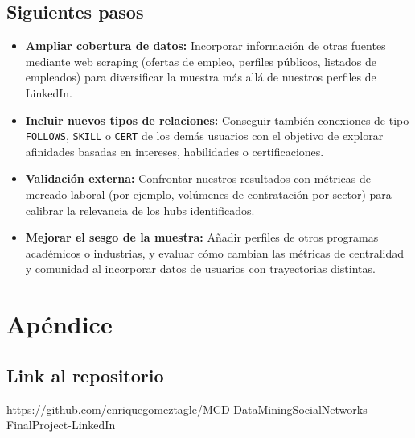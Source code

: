 \documentclass[10pt]{article}
\begin{document}
\subsection{Siguientes pasos}
\begin{itemize}
	\item \textbf{Ampliar cobertura de datos:} Incorporar información de otras fuentes mediante web scraping (ofertas de empleo, perfiles públicos, listados de empleados) para diversificar la muestra más allá de nuestros perfiles de LinkedIn.
	\item \textbf{Incluir nuevos tipos de relaciones:} Conseguir también conexiones de tipo \texttt{FOLLOWS}, \texttt{SKILL} o \texttt{CERT} de los demás usuarios con el objetivo de explorar afinidades basadas en intereses, habilidades o certificaciones.
	\item \textbf{Validación externa:} Confrontar nuestros resultados con métricas de mercado laboral (por ejemplo, volúmenes de contratación por sector) para calibrar la relevancia de los hubs identificados.
	\item \textbf{Mejorar el sesgo de la muestra:} Añadir perfiles de otros programas académicos o industrias, y evaluar cómo cambian las métricas de centralidad y comunidad al incorporar datos de usuarios con trayectorias distintas.
\end{itemize}
\appendix

\section{Apéndice}

\subsection*{Link al repositorio}
https://github.com/enriquegomeztagle/MCD-DataMiningSocialNetworks-FinalProject-LinkedIn
\end{document}
